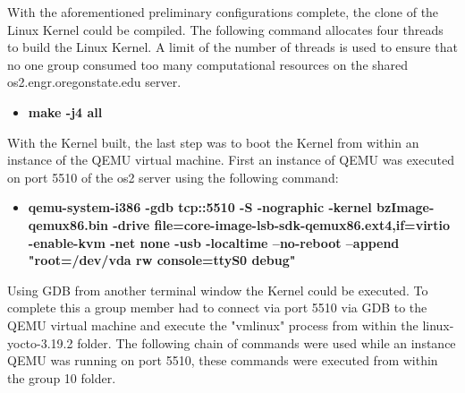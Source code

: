 \documentclass[10pt,onecolumn,draftclsnofoot]{IEEEtran} %
\begin{document}
\begin{singlespace}
 \normalfont \indent With the aforementioned preliminary configurations complete, the clone of the Linux Kernel could be compiled. The following command allocates four threads to build the Linux Kernel. A limit of the number of threads is used to ensure that no one group consumed too many computational resources on the shared os2.engr.oregonstate.edu server.
  \begin{itemize}
    \item \textbf{make -j4 all}
  \end{itemize}
  \normalfont \indent With the Kernel built, the last step was to boot the Kernel from within an instance of the QEMU virtual machine. First an instance of QEMU was executed on port 5510 of the os2 server using the following command:
  \begin{itemize}
    \item \textbf{qemu-system-i386 -gdb tcp::5510 -S -nographic -kernel bzImage-qemux86.bin -drive file=core-image-lsb-sdk-qemux86.ext4,if=virtio -enable-kvm -net none -usb -localtime --no-reboot --append "root=/dev/vda rw console=ttyS0 debug"}
  \end{itemize}
  \normalfont \indent Using GDB from another terminal window the Kernel could be executed. To complete this a group member had to connect via port 5510 via GDB to the QEMU virtual machine and execute the "vmlinux" process from within the linux-yocto-3.19.2 folder. The following chain of commands were used while an instance QEMU was running on port 5510, these commands were executed from within the group 10 folder.


\end{singlespace}
\end{document}

